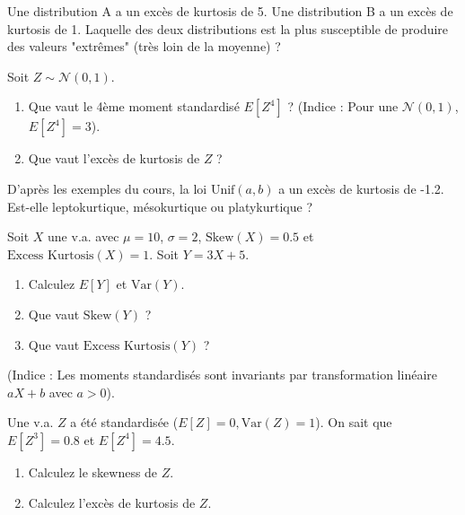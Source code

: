 \begin{exercicebox}
Une distribution A a un excès de kurtosis de 5. Une distribution B a un excès de kurtosis de 1.
Laquelle des deux distributions est la plus susceptible de produire des valeurs "extrêmes" (très loin de la moyenne) ?
\end{exercicebox}

\begin{exercicebox}
Soit $Z \sim \mathcal{N}(0, 1)$.
\begin{enumerate}
    \item Que vaut le 4ème moment standardisé $E[Z^4]$ ? (Indice : Pour une $\mathcal{N}(0,1)$, $E[Z^4]=3$).
    \item Que vaut l'excès de kurtosis de $Z$ ?
\end{enumerate}
\end{exercicebox}

\begin{exercicebox}
D'après les exemples du cours, la loi $\text{Unif}(a, b)$ a un excès de kurtosis de -1.2.
Est-elle leptokurtique, mésokurtique ou platykurtique ?
\end{exercicebox}


\begin{exercicebox}
Soit $X$ une v.a. avec $\mu=10$, $\sigma=2$, $\text{Skew}(X) = 0.5$ et $\text{Excess Kurtosis}(X) = 1$.
Soit $Y = 3X + 5$.
\begin{enumerate}
    \item Calculez $E[Y]$ et $\text{Var}(Y)$.
    \item Que vaut $\text{Skew}(Y)$ ?
    \item Que vaut $\text{Excess Kurtosis}(Y)$ ?
\end{enumerate}
(Indice : Les moments standardisés sont invariants par transformation linéaire $aX+b$ avec $a>0$).
\end{exercicebox}

\begin{exercicebox}
Une v.a. $Z$ a été standardisée ($E[Z]=0, \text{Var}(Z)=1$).
On sait que $E[Z^3] = 0.8$ et $E[Z^4] = 4.5$.
\begin{enumerate}
    \item Calculez le skewness de $Z$.
    \item Calculez l'excès de kurtosis de $Z$.
\end{enumerate}
\end{exercicebox}

